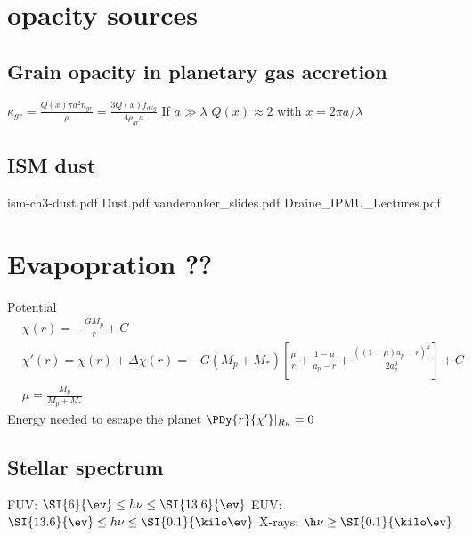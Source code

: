 \chapter{opacity sources}

\section{Grain opacity in planetary gas accretion}
$\kappa_{gr}=\frac{Q(x)\pi a^2n_{gr}}{\rho}=\frac{3Q(x)f_{d/g}}{4\rho_{gr}a}$
If $a\gg\lambda$ $Q(x)\approx2$ with $x=2\pi a/\lambda$

\section{ISM dust}
ism-ch3-dust.pdf
Dust.pdf
vanderanker_slides.pdf
Draine_IPMU_Lectures.pdf

\chapter{Evapopration ??}

Potential
\begin{align*}
&\chi(r)=-\frac{GM_p}{r}+C\\
&\chi'(r)=\chi(r)+\Delta\chi(r)=-G(M_p+M_*)[\frac{\mu}{r}+\frac{1-\mu}{a_p-r}+\frac{((1-\mu)a_p-r)^2}{2a_p^3}]+C\\
&\mu=\frac{M_p}{M_p+M_*}
\end{align*}
Energy needed to escape the planet $\PDy{r}{\chi'}|_{R_h}=0$

\section{Stellar spectrum}

FUV: $\SI{6}{\ev}\leq h\nu\leq\SI{13.6}{\ev}$
EUV: $\SI{13.6}{\ev}\leq h\nu\leq\SI{0.1}{\kilo\ev}$
X-rays: $\h\nu\geq\SI{0.1}{\kilo\ev}$